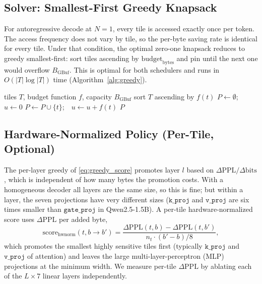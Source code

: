 \documentclass{ieeeaccess}
\begin{document}
\subsection{Solver: Smallest-First Greedy Knapsack}
\label{sec:solver}
For autoregressive decode at $N\!=\!1$, every tile is accessed exactly
once per token. The access frequency does not vary by tile, so the
per-byte saving rate is identical for every tile. Under that
condition, the optimal zero-one knapsack reduces to greedy
smallest-first: sort tiles ascending by $\mathrm{budget}_{\mathrm{bytes}}$
and pin until the next one would overflow $B_{\mathrm{GBuf}}$. This is
optimal for both schedulers and runs in $O(|T|\log|T|)$ time
(Algorithm~\ref{alg:greedy}).

\begin{algorithm}[t]
\caption{Greedy Smallest-First Residency}
\label{alg:greedy}
\begin{algorithmic}[1]
\REQUIRE tiles $T$, budget function $f$, capacity $B_{\mathrm{GBuf}}$
\STATE sort $T$ ascending by $f(t)$
\STATE $P \gets \emptyset$;\ \ $u \gets 0$
    \STATE $P \gets P \cup \{t\}$;\ \ $u \gets u + f(t)$
  \ENDIF
\ENDFOR
\RETURN $P$
\end{algorithmic}
\end{algorithm}

\subsection{Hardware-Normalized Policy (Per-Tile, Optional)}
\label{sec:hwnorm}
The per-layer greedy of \eqref{eq:greedy_score} promotes layer $l$
based on $\Delta\mathrm{PPL}/\Delta\mathrm{bits}$, which is independent
of how many bytes the promotion costs. With a homogeneous decoder all
layers are the same size, so this is fine; but within a layer, the seven
projections have very different sizes
($\texttt{k\_proj}$ and $\texttt{v\_proj}$ are six times smaller than
$\texttt{gate\_proj}$ in Qwen2.5-1.5B). A per-tile hardware-normalized
score uses $\Delta\mathrm{PPL}$ per added byte,
\begin{equation}
\mathrm{score}_{\mathrm{hwnorm}}(t, b\!\to\!b') = \frac{\Delta\mathrm{PPL}(t,b) - \Delta\mathrm{PPL}(t,b')}{n_t \cdot (b'-b)/8},
\label{eq:hwnorm}
\end{equation}
which promotes the smallest highly sensitive tiles first (typically
$\texttt{k\_proj}$ and $\texttt{v\_proj}$ of attention) and leaves the
large multi-layer-perceptron (MLP) projections at the minimum width. We
measure per-tile $\Delta\mathrm{PPL}$ by ablating each of the
$L\!\times\!7$ linear layers independently.
\end{document}
